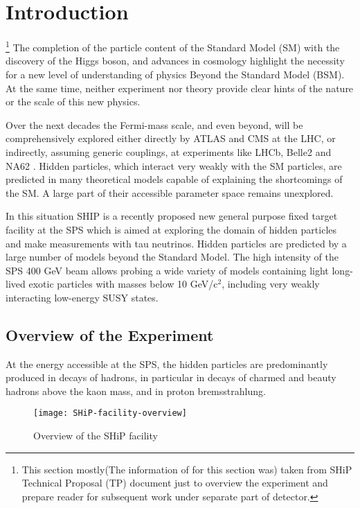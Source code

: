
\section{Introduction}

	\footnote{This section mostly(The information of for this section was) taken from SHiP Technical Proposal (TP) document \cite{ship_TP} just to overview the experiment and prepare reader for subsequent work under separate part of detector.}
	The completion of the particle content of the Standard Model (SM) with the discovery of the Higgs boson, and advances in cosmology highlight the necessity for a new level of understanding of physics Beyond the Standard Model (BSM). At the same time, neither experiment nor theory provide clear hints of the nature or the scale of this new physics.

	Over the next decades the Fermi-mass scale, and even beyond, will be comprehensively  explored either directly by ATLAS and CMS at the LHC, or indirectly, assuming generic couplings, at experiments like LHCb, Belle2 and NA62 \cite{NA62_TDR}. Hidden particles, which interact very weakly with the SM particles, are predicted in many theoretical models capable of explaining the shortcomings of the SM. A large part of their accessible parameter space remains unexplored. 

	In this situation SHIP is a recently proposed new general purpose fixed target facility at the SPS which is aimed at exploring the domain of hidden particles and make measurements with tau neutrinos. Hidden particles are predicted by a large number of models beyond the Standard Model. The high intensity of the SPS 400 GeV beam allows probing a wide variety of models containing light long-lived exotic particles with masses below 10 GeV/c$^2$, including very weakly interacting low-energy SUSY states.
	
		
	\subsection{Overview of the Experiment}
	At the energy accessible at the SPS, the hidden particles are predominantly produced in decays of hadrons, in particular in decays of charmed and beauty hadrons above the kaon mass, and in proton bremsstrahlung.

	\begin{figure}[!h]
	\centering
	\texttt{[image: SHiP-facility-overview]}
	\caption{Overview of the SHiP facility \cite{ship_TP} }
	\label{fig:detector-overwiew}
	\end{figure}
	
